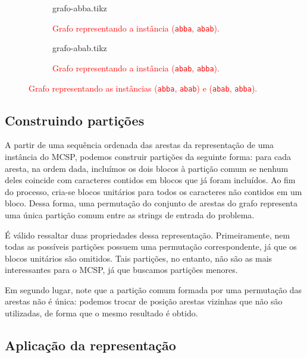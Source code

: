 \begin{figure}
    \centering
    \begin{subfigure}{\textwidth}
        \centering
        {grafo-abba.tikz}

        \caption{\textcolor{red}{Grafo representando a instância (\texttt{abba}, \texttt{abab}).}}
    \end{subfigure}
    \begin{subfigure}{\textwidth}
        \centering
        {grafo-abab.tikz}

        \caption{\textcolor{red}{Grafo representando a instância (\texttt{abab}, \texttt{abba}).}}
    \end{subfigure}

    \caption{\textcolor{red}{Grafo representando as instâncias (\texttt{abba}, \texttt{abab}) e (\texttt{abab}, \texttt{abba}).}}
    \label{fig:grafo}
\end{figure}

\subsection{Construindo partições} \label{sec:construindo-particoes}

    A partir de uma sequência ordenada das arestas da representação de uma instância do MCSP, podemos construir partições da seguinte forma: para cada aresta, na ordem dada, incluímos os dois blocos à partição comum se nenhum deles coincide com caracteres contidos em blocos que já foram incluídos. Ao fim do processo, cria-se blocos unitários para todos os caracteres não contidos em um bloco. Dessa forma, uma permutação do conjunto de arestas do grafo representa uma única partição comum entre as strings de entrada do problema.

    É válido ressaltar duas propriedades dessa representação. Primeiramente, nem todas as possíveis partições possuem uma permutação correspondente, já que os blocos unitários são omitidos. Tais partições, no entanto, não são as mais interessantes para o MCSP, já que buscamos partições menores.

    Em segundo lugar, note que a partição comum formada por uma permutação das arestas não é única: podemos trocar de posição arestas vizinhas que não são utilizadas, de forma que o mesmo resultado é obtido.

\subsection{Aplicação da representação}


